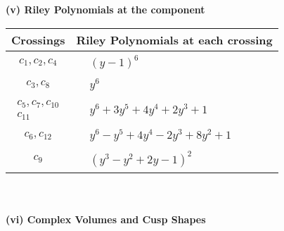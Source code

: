 \documentclass[1p]{elsarticle_modified}
\theoremstyle{definition}
\begin{document}
\newpage\renewcommand{\arraystretch}{1}
\flushleft \textbf{(v) Riley Polynomials at the component}\newline \\
\begin{tabular}{m{50pt}|m{274pt}}
Crossings & \hspace{64pt}Riley Polynomials at each crossing \\
\hline $$\begin{aligned}c_{1},c_{2},c_{4}\end{aligned}$$&$\begin{aligned}
&(y-1)^6
\end{aligned}$\\
\hline $$\begin{aligned}c_{3},c_{8}\end{aligned}$$&$\begin{aligned}
&y^6
\end{aligned}$\\
\hline $$\begin{aligned}c_{5},c_{7},c_{10}\\c_{11}\end{aligned}$$&$\begin{aligned}
&y^6+3 y^5+4 y^4+2 y^3+1
\end{aligned}$\\
\hline $$\begin{aligned}c_{6},c_{12}\end{aligned}$$&$\begin{aligned}
&y^6- y^5+4 y^4-2 y^3+8 y^2+1
\end{aligned}$\\
\hline $$\begin{aligned}c_{9}\end{aligned}$$&$\begin{aligned}
&(y^3- y^2+2 y-1)^2
\end{aligned}$\\
\hline
\end{tabular}\\~\\
\newpage\flushleft \textbf{(vi) Complex Volumes and Cusp Shapes}
\end{document}
